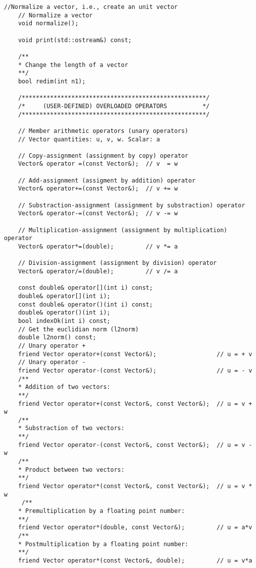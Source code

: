 \begin{lstlisting}[title={\url{http://folk.uio.no/mhjensen/compphys/programs/chapter03/cpp/Vector.h}}]
    //Normalize a vector, i.e., create an unit vector
    // Normalize a vector
    void normalize();
    
    void print(std::ostream&) const;
    
    /**
    * Change the length of a vector
    **/
    bool redim(int n1);           
    
    /****************************************************/
    /*     (USER-DEFINED) OVERLOADED OPERATORS          */
    /****************************************************/
    
    // Member arithmetic operators (unary operators)
    // Vector quantities: u, v, w. Scalar: a
    
    // Copy-assignment (assignment by copy) operator
    Vector& operator =(const Vector&);  // v  = w
    
    // Add-assignment (assigment by addition) operator 
    Vector& operator+=(const Vector&);  // v += w
    
    // Substraction-assignment (assignment by substraction) operator
    Vector& operator-=(const Vector&);  // v -= w
    
    // Multiplication-assignment (assignment by multiplication) operator
    Vector& operator*=(double);         // v *= a 
    
    // Division-assignment (assignment by division) operator
    Vector& operator/=(double);         // v /= a
    
    const double& operator[](int i) const;
    double& operator[](int i);
    const double& operator()(int i) const;
    double& operator()(int i);
    bool indexOk(int i) const;
    // Get the euclidian norm (l2norm)
    double l2norm() const;
    // Unary operator +
    friend Vector operator+(const Vector&);                 // u = + v
    // Unary operator -
    friend Vector operator-(const Vector&);                 // u = - v
    /**
    * Addition of two vectors: 
    **/
    friend Vector operator+(const Vector&, const Vector&);  // u = v + w
    /**
    * Substraction of two vectors: 
    **/
    friend Vector operator-(const Vector&, const Vector&);  // u = v - w
    /**
    * Product between two vectors:
    **/
    friend Vector operator*(const Vector&, const Vector&);  // u = v * w
     /**
    * Premultiplication by a floating point number: 
    **/
    friend Vector operator*(double, const Vector&);         // u = a*v
    /**
    * Postmultiplication by a floating point number: 
    **/
    friend Vector operator*(const Vector&, double);         // u = v*a
    

\end{lstlisting}
